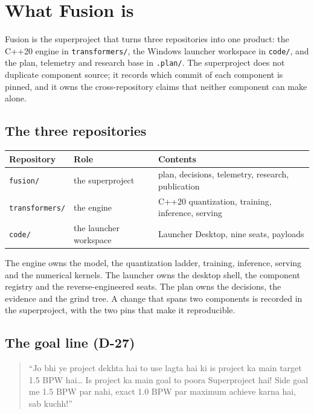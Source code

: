 \chapter{What Fusion is}

Fusion is the superproject that turns three repositories into one product: the C++20 engine in
\texttt{transformers/}, the Windows launcher workspace in \texttt{code/}, and the plan, telemetry
and research base in \texttt{.plan/}. The superproject does not duplicate component source; it
records which commit of each component is pinned, and it owns the cross-repository claims that
neither component can make alone.

\section{The three repositories}

\begin{tabular}{@{}lll@{}}
\toprule
Repository & Role & Contents\\
\midrule
\texttt{fusion/} & the superproject & plan, decisions, telemetry, research, publication\\
\texttt{transformers/} & the engine & C++20 quantization, training, inference, serving\\
\texttt{code/} & the launcher workspace & Launcher Desktop, nine seats, payloads\\
\bottomrule
\end{tabular}

\medskip
The engine owns the model, the quantization ladder, training, inference, serving and the
numerical kernels. The launcher owns the desktop shell, the component registry and the
reverse-engineered seats. The plan owns the decisions, the evidence and the grind tree. A change
that spans two components is recorded in the superproject, with the two pins that make it
reproducible.

\section{The goal line (D-27)}

\begin{quote}
``Jo bhi ye project dekhta hai to use lagta hai ki is project ka main target 1.5 BPW hai\ldots{}
Is project ka main goal to poora Superproject hai! Side goal me 1.5 BPW par nahi, exact 1.0 BPW
par maximum achieve karna hai, sab kuchh!''
\end{quote}

